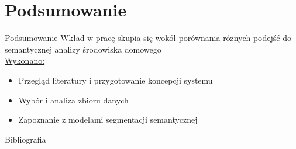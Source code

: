 \documentclass[10pt]{beamer}
\begin{document}
\section[Podsumowanie]{Podsumowanie}
\begin{frame}{Podsumowanie}
    Wkład w pracę skupia się wokół porównania różnych podejść do semantycznej analizy środowiska domowego \\


    \underline{Wykonano:}

    \begin{itemize}
        \item Przegląd literatury i przygotowanie koncepcji systemu
        \item Wybór i analiza zbioru danych
        \item Zapoznanie z modelami segmentacji semantycznej
    \end{itemize}
\end{frame}

\begin{frame}[allowframebreaks]{Bibliografia}
    
    
    
    
\end{frame}




\end{document}
